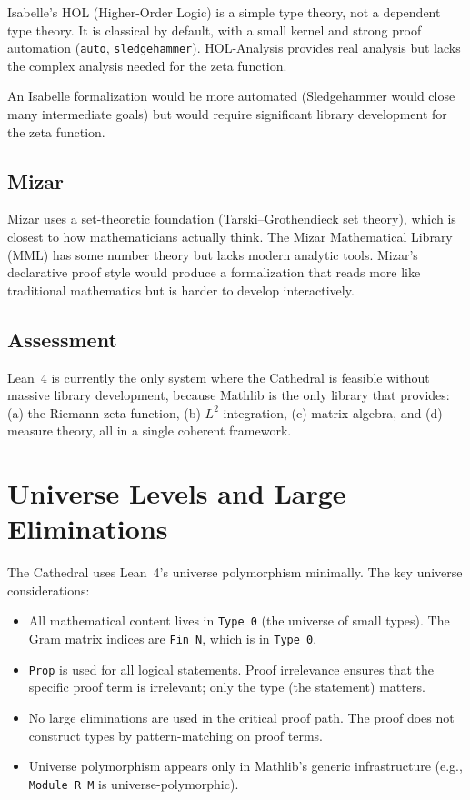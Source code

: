 \documentclass[11pt,a4paper]{article}
\theoremstyle{plain}
\theoremstyle{definition}
\newcommand{\lean}[1]{\texttt{#1}}
\begin{document}
Isabelle's HOL (Higher-Order Logic) is a simple type theory, not a
dependent type theory. It is classical by default, with a small
kernel and strong proof automation (\lean{auto}, \lean{sledgehammer}).
HOL-Analysis provides real analysis but lacks the complex analysis
needed for the zeta function.

An Isabelle formalization would be more automated (Sledgehammer would
close many intermediate goals) but would require significant library
development for the zeta function.

\subsection{Mizar}

Mizar uses a set-theoretic foundation (Tarski--Grothendieck set theory),
which is closest to how mathematicians actually think. The Mizar
Mathematical Library (MML) has some number theory but lacks modern
analytic tools. Mizar's declarative proof style would produce a
formalization that reads more like traditional mathematics but is
harder to develop interactively.

\subsection{Assessment}

Lean~4 is currently the only system where the Cathedral is feasible
without massive library development, because Mathlib is the only
library that provides: (a) the Riemann zeta function, (b) $L^2$
integration, (c) matrix algebra, and (d) measure theory, all in a
single coherent framework.

\section{Universe Levels and Large Eliminations}
\label{sec:universes}

The Cathedral uses Lean~4's universe polymorphism minimally. The
key universe considerations:

\begin{itemize}
  \item All mathematical content lives in \lean{Type 0} (the universe
    of small types). The Gram matrix indices are \lean{Fin N}, which
    is in \lean{Type 0}.
  \item \lean{Prop} is used for all logical statements. Proof
    irrelevance ensures that the specific proof term is irrelevant;
    only the type (the statement) matters.
  \item No large eliminations are used in the critical proof path.
    The proof does not construct types by pattern-matching on proof
    terms.
  \item Universe polymorphism appears only in Mathlib's generic
    infrastructure (e.g., \lean{Module R M} is universe-polymorphic).
\end{itemize}
\end{document}
